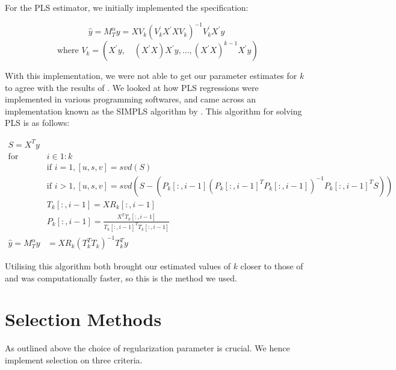 For the PLS estimator, we initially implemented the specification:

\[\widehat{y} = M_{T}^{\alpha} y = X V_{k}\left(V_{k}^{\prime} X^{\prime} X V_{k}\right)^{-1} V_{k}^{\prime} X^{\prime} y\]
\[\text{ where } V_{k}=\left(X^{\prime} y, \quad\left(X^{\prime} X\right) X^{\prime} y, \ldots,\left(X^{\prime} X\right)^{k-1} X^{\prime} y\right)\]

With this implementation, we were not able to get our parameter estimates for $k$ to agree with the results of \citeauthor{carrasco2016sample}. We looked at how PLS regressions were implemented in various programming softwares, and came across an implementation known as the SIMPLS algorithm by \citeauthor{de1993simpls}. This algorithm for solving PLS is as follows:

\begin{align}
\nonumber S = X^{T} y & \\
\nonumber \text{for } & i \in 1:k \\
\nonumber &\text{if } i = 1, [u, s, v] = svd(S) \\
\nonumber &\text{if } i > 1, [u, s, v] = svd(S - (P_{k}[:, i-1](P_{k}[:, i-1]^{T} P_{k}[:, i-1])^{-1} P_{k}[:, i-1]^{T} S)) \\
\nonumber &T_{k}[:, i - 1] = X R_{k}[:, i - 1] \\
\nonumber &P_{k}[:, i - 1] = \frac{X^{T} T_{k}[:, i - 1]}{T_{k}[:, i - 1]^{T}T_{k}[:, i - 1]} \\
\nonumber \widehat{y} = M^{\alpha}_{T} y &= X R_{k} (T^{T}_{k} T_{k})^{-1} T^{T}_{k} y
\end{align}

Utilising this algorithm both brought our estimated values of $k$ closer to those of \citeauthor{carrasco2016sample} and was computationally faster, so this is the method we used.

\section{Selection Methods} \label{sec::cv}

As outlined above the choice of regularization parameter is crucial. We hence implement selection on three criteria.

